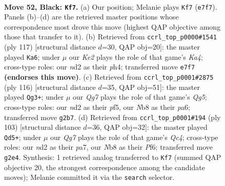 \documentclass[11pt]{article}
\begin{document}
\clearpage

\begin{figure}[p]\centering
\begin{subfigure}{0.46\textwidth}\centering
\resizebox{\linewidth}{!}{%
\newchessgame
\chessboard[
  setfen={1n2n3/4k3/7p/Q6K/P7/8/3N2q1/8 b - - 4 52},
  showmover=false,
  pgfstyle=straightmove, color=movearrow, markmove={e7-f7}
]}
\caption{}
\end{subfigure}\hfill
\begin{subfigure}{0.46\textwidth}\centering
\resizebox{\linewidth}{!}{%
\newchessgame
\chessboard[
  setfen={8/5p2/5K2/k7/5Q1P/8/8/3q4 b - - 7 59},
  showmover=false,
  pgfstyle=straightmove, color=movearrow, markmove={a5-a6}
]}
\caption{}
\end{subfigure}
\\[4pt]
\begin{subfigure}{0.46\textwidth}\centering
\resizebox{\linewidth}{!}{%
\newchessgame
\chessboard[
  setfen={8/2P5/p1qkb3/P4pQ1/8/8/4N3/4K3 w - - 1 59},
  showmover=false,
  pgfstyle=straightmove, color=movearrow, markmove={g5-g3}
]}
\caption{}
\end{subfigure}\hfill
\begin{subfigure}{0.46\textwidth}\centering
\resizebox{\linewidth}{!}{%
\newchessgame
\chessboard[
  setfen={8/P7/5pk1/2q5/2p5/6p1/Q5K1/8 b - - 7 52},
  showmover=false,
  pgfstyle=straightmove, color=movearrow, markmove={c5-d5}
]}
\caption{}
\end{subfigure}
\caption{\textbf{Move 52, Black: \texttt{Kf7}.} (a) Our position; Melanie plays \texttt{Kf7} (\texttt{e7f7}). Panels (b)--(d) are the retrieved master positions whose correspondence most drove this move (highest QAP objective among those that transfer to it). (b) Retrieved from \texttt{ccrl\_top\_p0000\#1541} (ply 117) [structural distance $d$=30, QAP obj=20]: the master played \texttt{Ka6}; under $\mu$ our \emph{Ke2} plays the role of that game's \emph{Ka4}; cross-type roles: our \emph{n}d2 as their \emph{p}h4; transferred move \texttt{e7f7} \textbf{(endorses this move)}. (c) Retrieved from \texttt{ccrl\_top\_p0001\#2875} (ply 116) [structural distance $d$=35, QAP obj=51]: the master played \texttt{Qg3+}; under $\mu$ our \emph{Qg7} plays the role of that game's \emph{Qg5}; cross-type roles: our \emph{n}d2 as their \emph{p}f5, our \emph{N}b8 as their \emph{p}a6; transferred move \texttt{g2b7}. (d) Retrieved from \texttt{ccrl\_top\_p0001\#194} (ply 103) [structural distance $d$=36, QAP obj=32]: the master played \texttt{Qd5+}; under $\mu$ our \emph{Qg7} plays the role of that game's \emph{Qc4}; cross-type roles: our \emph{n}d2 as their \emph{p}a7, our \emph{N}b8 as their \emph{P}f6; transferred move \texttt{g2e4}. Synthesis: 1 retrieved analog transferred to \texttt{Kf7} (summed QAP objective 20, the strongest correspondence among the candidate moves); Melanie committed it via the \texttt{search} selector.}
\label{fig:thought-m103}
\end{figure}
\end{document}
